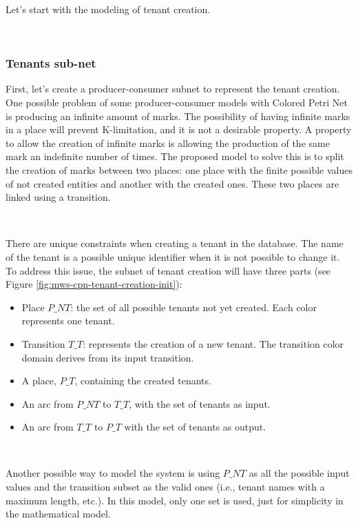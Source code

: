 \documentclass[12pt,english]{article} %
\begin{document}
Let's start with the modeling of tenant creation.

\

\subsubsection{Tenants sub-net}
First, let's create a producer-consumer subnet to represent the tenant creation.
One possible problem of some producer-consumer models with Colored Petri Net is producing an infinite amount of marks.
The possibility of having infinite marks in a place will prevent K-limitation, and it is not a desirable property.
A property to allow the creation of infinite marks is allowing the production of the same mark an indefinite number of times.
The proposed model to solve this is to split the creation of marks between two places: one place with the finite possible values of not created entities and another with the created ones.
These two places are linked using a transition.

\

There are unique constraints when creating a tenant in the database.
The name of the tenant is a possible unique identifier when it is not possible to change it.
To address this issue, the subnet of tenant creation will have three parts (see Figure \ref{fig:mws-cpn-tenant-creation-init}):

\begin{itemize}
    \item Place $P\_NT$: the set of all possible tenants not yet created.
    Each color represents one tenant.
    \item Transition $T\_T$: represents the creation of a new tenant.
    The transition color domain derives from its input transition.
    \item A place, $P\_T$, containing the created tenants.
    \item An arc from $P\_NT$ to $T\_T$, with the set of tenants as input.
    \item An arc from $T\_T$ to  $P\_T$ with the set of tenants as output.
\end{itemize}

\

Another possible way to model the system is using $P\_NT$ as all the possible input values and the transition subset as the valid ones (i.e., tenant names with a maximum length, etc.).
In this model, only one set is used, just for simplicity in the mathematical model.

\
\end{document}
